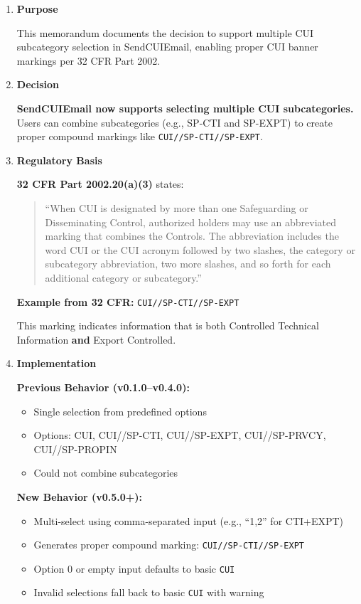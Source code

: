 \documentclass[11pt,letterpaper]{article}
\newcommand{\dmsection}[1]{\item \textbf{#1}\par}
\begin{document}
\begin{enumerate}

\dmsection{Purpose}

This memorandum documents the decision to support multiple CUI subcategory selection in SendCUIEmail, enabling proper CUI banner markings per 32 CFR Part 2002.

\dmsection{Decision}

\textbf{SendCUIEmail now supports selecting multiple CUI subcategories.} Users can combine subcategories (e.g., SP-CTI and SP-EXPT) to create proper compound markings like \texttt{CUI//SP-CTI//SP-EXPT}.

\dmsection{Regulatory Basis}

\textbf{32 CFR Part 2002.20(a)(3)} states:

\begin{quote}
``When CUI is designated by more than one Safeguarding or Disseminating Control, authorized holders may use an abbreviated marking that combines the Controls. The abbreviation includes the word CUI or the CUI acronym followed by two slashes, the category or subcategory abbreviation, two more slashes, and so forth for each additional category or subcategory.''
\end{quote}

\textbf{Example from 32 CFR:} \texttt{CUI//SP-CTI//SP-EXPT}

This marking indicates information that is both Controlled Technical Information \textbf{and} Export Controlled.

\dmsection{Implementation}

\textbf{Previous Behavior (v0.1.0--v0.4.0):}
\begin{itemize}
    \item Single selection from predefined options
    \item Options: CUI, CUI//SP-CTI, CUI//SP-EXPT, CUI//SP-PRVCY, CUI//SP-PROPIN
    \item Could not combine subcategories
\end{itemize}

\textbf{New Behavior (v0.5.0+):}
\begin{itemize}
    \item Multi-select using comma-separated input (e.g., ``1,2'' for CTI+EXPT)
    \item Generates proper compound marking: \texttt{CUI//SP-CTI//SP-EXPT}
    \item Option 0 or empty input defaults to basic \texttt{CUI}
    \item Invalid selections fall back to basic \texttt{CUI} with warning
\end{itemize}


\end{enumerate}
\end{document}
